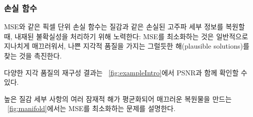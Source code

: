 \documentclass[10pt,twocolumn,letterpaper]{article}
\newcommand{\kor}[1]{#1}
\newcommand{\eng}[1]{}
\newcommand{\summary}[1]{}
\begin{document}
\subsubsection{\eng{Loss functions}\kor{손실 함수}}
\eng{
Pixel-wise loss functions such as \ac{MSE} struggle to handle the uncertainty inherent in recovering lost high-frequency details such as texture: minimizing \ac{MSE} encourages finding pixel-wise averages of plausible solutions which are typically overly-smooth and thus have poor perceptual quality \cite{Mathieu2015, Johnson16PercepLoss, dosovitskiy2016generating, bruna2016super}.
}\kor{
\ac{MSE}와 같은 픽셀 단위 손실 함수는 질감과 같은 손실된 고주파 세부 정보를 복원할 때, 내재된 불확실성을 처리하기 위해 노력한다: \ac{MSE}를 최소화하는 것은 일반적으로 지나치게 매끄러워서, 나쁜 지각적 품질을 가지는 그럴듯한 해(plausible solutions)를 찾는 것을 촉진한다\cite{Mathieu2015, Johnson16PercepLoss, dosovitskiy2016generating, bruna2016super}.
}
\eng{
Reconstructions of varying perceptual quality are exemplified with corresponding \ac{PSNR} in \figurename~\ref{fig:exampleIntro}.
}\kor{
다양한 지각 품질의 재구성 결과는 \figurename~\ref{fig:exampleIntro}에서 \ac{PSNR}과 함께 확인할 수 있다.
} \eng{
We illustrate the problem of minimizing \ac{MSE} in \figurename~\ref{fig:manifold} where multiple potential solutions with high texture details are averaged to create a smooth reconstruction.
}\kor{
높은 질감 세부 사항의 여러 잠재적 해가 평균화되어 매끄러운 복원물을 만드는 \figurename~\ref{fig:manifold}에서는 \ac{MSE}를 최소화하는 문제를 설명한다.
}

\summary{
MSE 손실 함수는 고주파 세부 정보를 복원하기 어려워, 나쁜 지각적 품질을 가지는 해를 찾을 수 있음.
}
\end{document}

